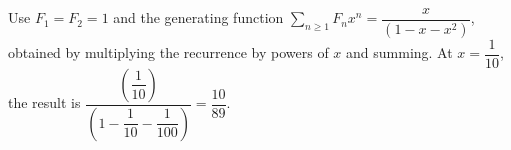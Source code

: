 Use $F_1=F_2=1$ and the generating function $\sum_{n\ge1}F_nx^n=\dfrac{x}{(1-x-x^2)}$, obtained by multiplying the recurrence by powers of $x$ and summing. At $x=\dfrac{1}{10}$, the result is $\dfrac{(\dfrac{1}{10})}{(1-\dfrac{1}{10}-\dfrac{1}{100})}=\boxed{\dfrac{10}{89}}$.
